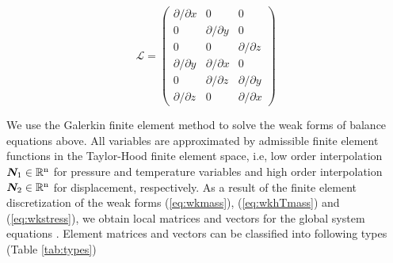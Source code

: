 \begin{equation}
\mathcal{L} =
\left(%
\begin{array}{ccc}
 \partial/\partial x & 0 & 0 \\
 0 & \partial/\partial y & 0 \\
 0 & 0 & \partial/\partial z \\
 \partial/\partial y & \partial/\partial x & 0 \\
 0 & \partial/\partial z & \partial/\partial y \\
 \partial/\partial z & 0 & \partial/\partial x
\end{array}%
\right)
\label{eqn:diffop}
\end{equation}

We use the Galerkin finite element method to solve the weak forms of
balance equations above. All variables are approximated by
admissible finite element functions in the Taylor-Hood finite
element space, i.e, low order interpolation $\bm N_1\in
\mathbb{R}^{\mathrm{n}}$ for pressure and temperature variables and
high order interpolation $\bm N_2 \in \mathbb{R}^{\mathrm{n}}$ for
displacement, respectively. As a result of the finite element
discretization of the weak forms (\ref{eq:wkmass}),
(\ref{eq:wkhTmass}) and (\ref{eq:wkstress}), we obtain local
matrices and vectors for the global system equations
\cite{Kol:02}. Element matrices and vectors can be classified
into following types (Table \ref{tab:types})

